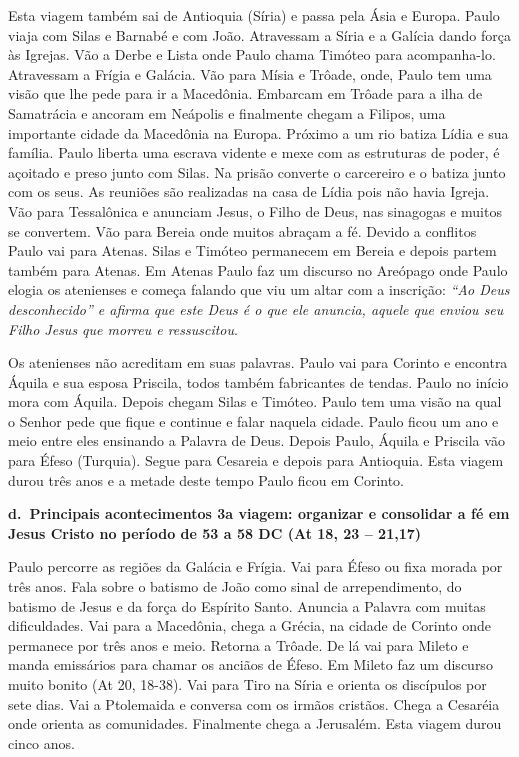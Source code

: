 \documentclass[
]{book}
\begin{document}
Esta viagem também sai de Antioquia (Síria) e passa pela Ásia e Europa. Paulo viaja com Silas e Barnabé e com João. Atravessam a Síria e a Galícia dando força às Igrejas. Vão a Derbe e Lista onde Paulo chama Timóteo para acompanha-lo. Atravessam a Frígia e Galácia. Vão para Mísia e Trôade, onde, Paulo tem uma visão que lhe pede para ir a Macedônia. Embarcam em Trôade para a ilha de Samatrácia e ancoram em Neápolis e finalmente chegam a Filipos, uma importante cidade da Macedônia na Europa. Próximo a um rio batiza Lídia e sua família. Paulo liberta uma escrava vidente e mexe com as estruturas de poder, é açoitado e preso junto com Silas. Na prisão converte o carcereiro e o batiza junto com os seus. As reuniões são realizadas na casa de Lídia pois não havia Igreja. Vão para Tessalônica e anunciam Jesus, o Filho de Deus, nas sinagogas e muitos se convertem. Vão para Bereia onde muitos abraçam a fé. Devido a conflitos Paulo vai para Atenas. Silas e Timóteo permanecem em Bereia e depois partem também para Atenas. Em Atenas Paulo faz um discurso no Areópago onde Paulo elogia os atenienses e começa falando que viu um altar com a inscrição: \emph{``Ao Deus desconhecido'' e afirma que este Deus é o que ele anuncia, aquele que enviou seu Filho Jesus que morreu e ressuscitou}.

Os atenienses não acreditam em suas palavras. Paulo vai para Corinto e encontra Áquila e sua esposa Priscila, todos também fabricantes de tendas. Paulo no início mora com Áquila. Depois chegam Silas e Timóteo. Paulo tem uma visão na qual o Senhor pede que fique e continue e falar naquela cidade. Paulo ficou um ano e meio entre eles ensinando a Palavra de Deus. Depois Paulo, Áquila e Priscila vão para Éfeso (Turquia). Segue para Cesareia e depois para Antioquia. Esta viagem durou três anos e a metade deste tempo Paulo ficou em Corinto.

\textbf{d.~Principais acontecimentos 3a viagem: organizar e consolidar a fé em Jesus Cristo no período de 53 a 58 DC (At 18, 23 -- 21,17)}

Paulo percorre as regiões da Galácia e Frígia. Vai para Éfeso ou fixa morada por três anos. Fala sobre o batismo de João como sinal de arrependimento, do batismo de Jesus e da força do Espírito Santo. Anuncia a Palavra com muitas dificuldades. Vai para a Macedônia, chega a Grécia, na cidade de Corinto onde permanece por três anos e meio. Retorna a Trôade. De lá vai para Mileto e manda emissários para chamar os anciãos de Éfeso. Em Mileto faz um discurso muito bonito (At 20, 18-38). Vai para Tiro na Síria e orienta os discípulos por sete dias. Vai a Ptolemaida e conversa com os irmãos cristãos. Chega a Cesaréia onde orienta as comunidades. Finalmente chega a Jerusalém. Esta viagem durou cinco anos.
\end{document}
